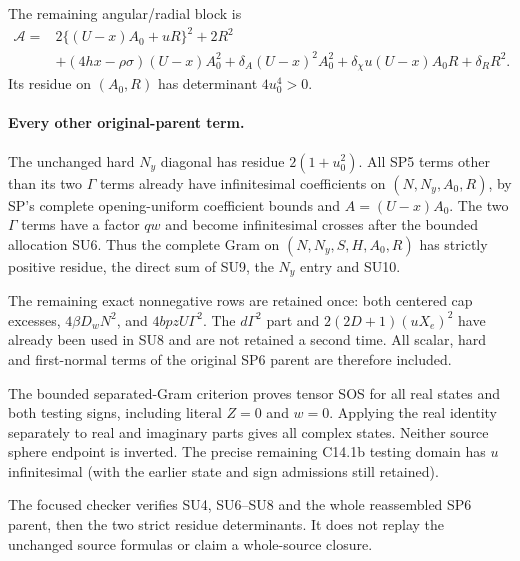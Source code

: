 The remaining angular/radial block is
\[
\begin{split}
 \mathscr A={}&2\{(U-x)A_0+uR\}^2+2R^2\\
 &+(4hx-\rho\sigma)(U-x)A_0^2
   +\delta_A(U-x)^2A_0^2
   +\delta_\chi u(U-x)A_0R+\delta_RR^2.
\end{split} \tag{SU10}
\]
Its residue on $(A_0,R)$ has determinant $4u_0^4>0$.

\paragraph{Every other original-parent term.}
The unchanged hard $N_y$ diagonal has residue $2(1+u_0^2)$.
All SP5 terms other than its two $\Gamma$ terms already have
infinitesimal coefficients on $(N,N_y,A_0,R)$, by SP's complete
opening-uniform coefficient bounds and $A=(U-x)A_0$.
The two $\Gamma$ terms have a factor $qw$ and become infinitesimal
crosses after the bounded allocation SU6.  Thus the complete Gram
on $(N,N_y,S,H,A_0,R)$ has strictly positive residue, the direct
sum of SU9, the $N_y$ entry and SU10.

The remaining exact nonnegative rows are retained once: both
centered cap excesses, $4\beta D_wN^2$, and
$4bpzU\Gamma^2$.  The $d\Gamma^2$ part and
$2(2D+1)(uX_e)^2$ have already been used in SU8 and are not
retained a second time.  All scalar, hard and first-normal terms
of the original SP6 parent are therefore included.

The bounded separated-Gram criterion proves tensor SOS for all real
states and both testing signs, including literal $Z=0$ and $w=0$.
Applying the real identity separately to real and imaginary parts
gives all complex states.  Neither source sphere endpoint is inverted.
The precise remaining C14.1b testing domain has $u$ infinitesimal
(with the earlier state and sign admissions still retained).

The focused checker verifies SU4, SU6--SU8 and the whole reassembled
SP6 parent, then the two strict residue determinants.  It does not
replay the unchanged source formulas or claim a whole-source closure.
